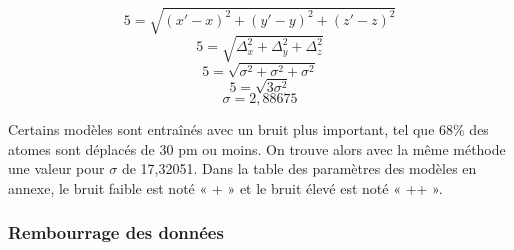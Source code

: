 \vspace{0.7cm}

\[
	5 = \sqrt{(x'-x)^2 + (y'-y)^2 + (z'-z)^2}
\]
\[
	5 = \sqrt{\Delta_x^2 + \Delta_y^2 + \Delta_z^2}
\]
\[
	5 = \sqrt{\sigma^2 + \sigma^2 + \sigma^2}
\]
\[
	5 = \sqrt{3\sigma^2}
\]
\[
	\sigma = 2,88675
\]

\vspace{0.7cm}

Certains modèles sont entraînés avec un bruit plus important, tel que 68\% des atomes sont déplacés de 30 pm ou moins. On trouve alors avec la même méthode une valeur pour $\sigma$ de 17,32051. Dans la table des paramètres des modèles en annexe, le bruit faible est noté « + » et le bruit élevé est noté « ++ ».

\subsubsection{Rembourrage des données}

